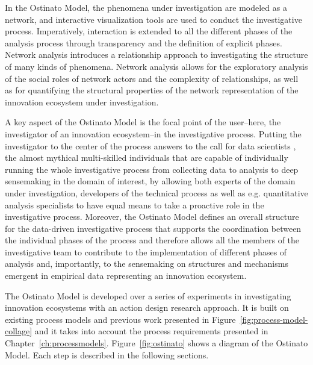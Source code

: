 In the Ostinato Model, the phenomena under investigation are modeled as a network, and interactive visualization tools are used to conduct the investigative process. Imperatively, interaction is extended to all the different phases of the analysis process through transparency and the definition of explicit phases. Network analysis introduces a relationship approach to investigating the structure of many kinds of phenomena. Network analysis allows for the exploratory analysis of the social roles of network actors and the complexity of relationships, as well as for quantifying the structural properties of the network representation of the innovation ecosystem under investigation.

A key aspect of the Ostinato Model is the focal point of the user--here, the investigator of an innovation ecosystem--in the investigative process. Putting the investigator to the center of the process answers to the call for data scientists \citep{Davenport2014BigOpportunities}, the almost mythical multi-skilled individuals that are capable of individually running the whole investigative process from collecting data to analysis to deep sensemaking in the domain of interest, by allowing both experts of the domain under investigation, developers of the technical process as well as e.g. quantitative analysis specialists to have equal means to take a proactive role in the investigative process. Moreover, the Ostinato Model defines an overall structure for the data-driven investigative process that supports the coordination between the individual phases of the process and therefore allows all the members of the investigative team to contribute to the implementation of different phases of analysis and, importantly, to the sensemaking on structures and mechanisms emergent in empirical data representing an innovation ecosystem.

The Ostinato Model is developed over a series of experiments in investigating innovation ecosystems with an action design research approach. It is built on existing process models and previous work presented in Figure~\ref{fig:process-model-collage} and it takes into account the process requirements presented in Chapter~\ref{ch:processmodels}. Figure~\ref{fig:ostinato} shows a diagram of the Ostinato Model. Each step is described in the following sections.

